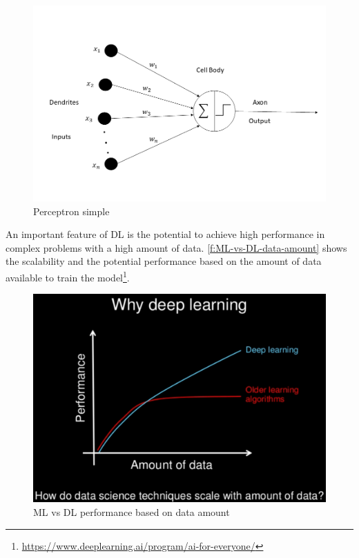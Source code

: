\begin{figure}[h]
\centering
\includegraphics[width=\linewidth]{figures/Ch2/Perceptron.png}
\caption{Perceptron simple}
\label{f:Perceptron}
\end{figure}
 
An important feature of \ac{DL} is the potential to achieve high performance in complex problems with a high amount of data. \autoref{f:ML-vs-DL-data-amount} shows the scalability and the potential performance based on the amount of data available to train the model\footnote{\url{https://www.deeplearning.ai/program/ai-for-everyone/}}.

\begin{figure}[h!]
\centering
\includegraphics[width=12cm]{figures/Ch2/MlvsDL-data-amount.png}
\caption{ML vs DL performance based on data amount}
\label{f:ML-vs-DL-data-amount}
\end{figure} 

